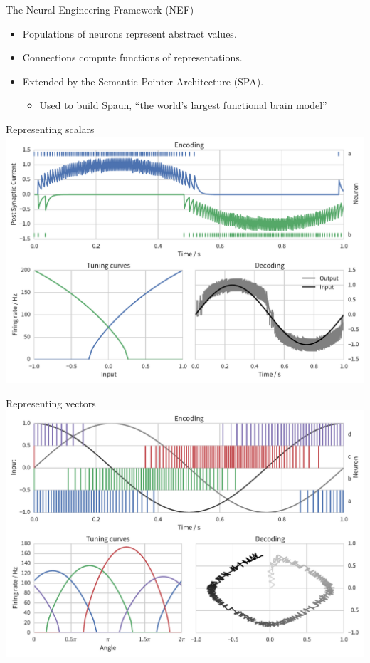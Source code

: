 \documentclass[handout,t]{beamer}
\begin{document}
  \begin{frame}{The Neural Engineering Framework (NEF)}
    \begin{itemize}
      \item Populations of neurons represent abstract values.
      \item Connections compute functions of representations.
      \item Extended by the Semantic Pointer Architecture (SPA).
        \begin{itemize}
          \item Used to build Spaun, ``the world's largest functional brain model''
        \end{itemize}
    \end{itemize}
  \end{frame}

  \begin{frame}[plain]{Representing scalars}
    \vfill
    \includegraphics[width=\textwidth]{encoding_decoding}
    \vfill
  \end{frame}

  \begin{frame}[plain]{Representing vectors}
    \vfill
    \includegraphics[width=\textwidth]{encoding_decoding2d}
    \vfill
  \end{frame}
\end{document}
